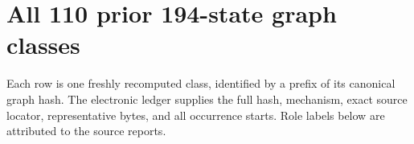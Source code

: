 \documentclass[10pt,letterpaper]{article}
\begin{document}
\clearpage\section{All 110 prior 194-state graph classes}\label{app:classes}
Each row is one freshly recomputed class, identified by a prefix of its
canonical graph hash. The electronic ledger supplies the full hash,
mechanism, exact source locator, representative bytes, and all occurrence
starts. Role labels below are attributed to the source reports.

\end{document}
